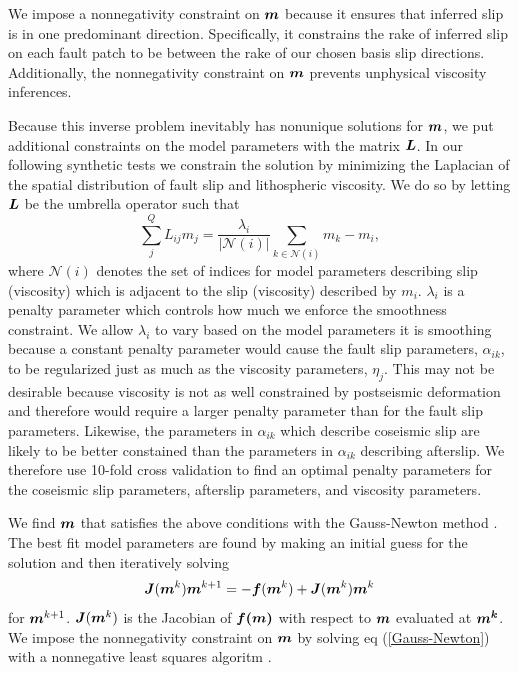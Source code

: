 \documentclass[extra]{gji}
\begin{document}
We impose a nonnegativity constraint on $\mitbf{m}$ because it
ensures that inferred slip is in one predominant direction.
Specifically, it constrains the rake of inferred slip on each fault
patch to be between the rake of our chosen basis slip
directions. Additionally, the nonnegativity constraint on $\mitbf{m}$
prevents unphysical viscosity inferences.

Because this inverse problem inevitably has nonunique solutions for
$\mitbf{m}$, we put additional constraints on the model parameters with
the matrix $\mitbf{L}$.  In our following synthetic tests we constrain
the solution by minimizing the Laplacian of the spatial distribution
of fault slip and lithospheric viscosity.  We do so by letting
$\mitbf{L}$ be the umbrella operator \citep{D1999} such that
\begin{equation}
  \sum_j^{Q}L_{ij}m_j = \frac{\lambda_i}{|\mathcal{N}(i)|}\sum_{k\in \mathcal{N}(i)} m_k - m_i,
\end{equation}
where $\mathcal{N}(i)$ denotes the set of indices for model parameters
describing slip (viscosity) which is adjacent to the slip (viscosity)
described by $m_i$. $\lambda_i$ is a penalty parameter which controls
how much we enforce the smoothness constraint. We allow $\lambda_i$ to
vary based on the model parameters it is smoothing because a constant
penalty parameter would cause the fault slip parameters,
$\alpha_{ik}$, to be regularized just as much as the viscosity
parameters, $\eta_j$.  This may not be desirable because viscosity is
not as well constrained by postseismic deformation and therefore would
require a larger penalty parameter than for the fault slip
parameters. Likewise, the parameters in $\alpha_{ik}$ which describe
coseismic slip are likely to be better constained than the parameters
in $\alpha_{ik}$ describing afterslip.  We therefore use 10-fold cross
validation to find an optimal penalty parameters for the coseismic
slip parameters, afterslip parameters, and viscosity parameters.

We find $\mitbf{m}$ that satisfies the above conditions with the
Gauss-Newton method \citep[e.g.][]{A2013}.  The best fit model parameters are
found by making an initial guess for the solution and then iteratively
solving
\begin{equation}\label{Gauss-Newton}
\mitbf{J}(\mitbf{m}^{k})\mitbf{m}^{k+1} = -\mitbf{f}(\mitbf{m}^k) + \mitbf{J}(\mitbf{m}^{k})\mitbf{m}^{k}
\end{equation}
for $\mitbf{m}^{k+1}$.  $\mitbf{J}(\mitbf{m}^k)$ is the Jacobian of
$\mitbf{f(m)}$ with respect to $\mitbf{m}$ evaluated at $\mitbf{m^k}$. We
impose the nonnegativity constraint on $\mitbf{m}$ by solving eq
(\ref{Gauss-Newton}) with a nonnegative least squares algoritm
\citep{LH1974}.
\end{document}
